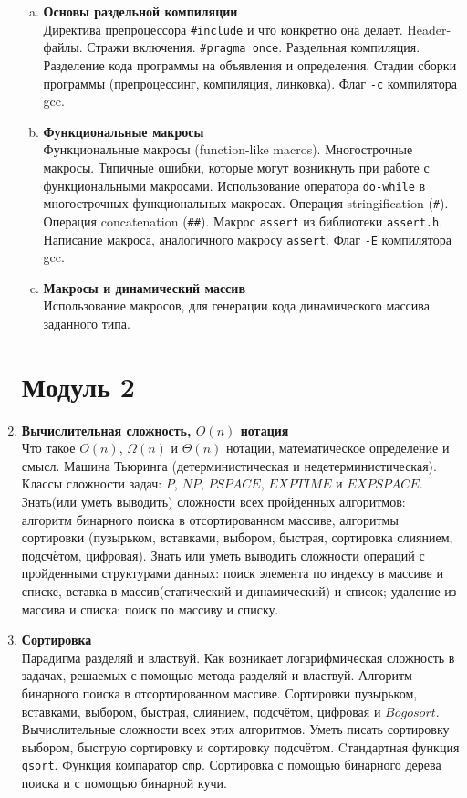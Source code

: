 \documentclass{article}
\begin{document}
\begin{enumerate}
\begin{enumerate}[a.]
\item \textbf{Основы раздельной компиляции}\\
Директива препроцессора \texttt{\#include} и что конкретно она делает. Header-файлы.
Стражи включения. \texttt{\#pragma once}. Раздельная компиляция. Разделение кода программы на объявления и определения.
Стадии сборки программы (препроцессинг, компиляция, линковка). Флаг \texttt{-c} компилятора gcc.


\item \textbf{Функциональные макросы}\\
Функциональные макросы (function-like macros). Многострочные макросы. Типичные ошибки, которые могут возникнуть при работе с функциональными макросами. Использование оператора \texttt{do-while} в многострочных функциональных макросах. Операция stringification (\texttt{\#}). Операция concatenation (\texttt{\#\#}). Макрос \texttt{assert} из библиотеки \texttt{assert.h}. Написание макроса, аналогичного макросу \texttt{assert}. Флаг \texttt{-E} компилятора gcc.

\item \textbf{Макросы и динамический массив}\\
Использование макросов, для генерации кода динамического массива заданного типа.
\end{enumerate}


\iffalse
\newpage
\section*{Модуль 2}
\item  \textbf{Вычислительная сложность, $O(n)$ нотация}\\
Что такое $O(n)$, $\Omega(n)$ и $\Theta(n)$ нотации, математическое определение и смысл. Машина Тьюринга (детерминистическая и недетерминистическая). Классы сложности задач: $P$, $NP$, $PSPACE$, $EXPTIME$ и $EXPSPACE$.
Знать(или уметь выводить) сложности всех пройденных алгоритмов: алгоритм бинарного поиска в отсортированном массиве, алгоритмы сортировки (пузырьком, вставками, выбором, быстрая, сортировка слиянием, подсчётом, цифровая). Знать или уметь выводить сложности операций с пройденными структурами данных: поиск элемента по индексу в массиве и списке, вставка в массив(статический и динамический) и список; удаление из массива и списка; поиск по массиву и списку.

\item \textbf{Сортировка}\\
Парадигма разделяй и властвуй. Как возникает логарифмическая сложность в задачах, решаемых с помощью метода разделяй и властвуй. Алгоритм бинарного поиска в отсортированном массиве.
Сортировки пузырьком, вставками, выбором, быстрая, слиянием, подсчётом, цифровая и $Bogosort$. Вычислительные сложности всех этих алгоритмов. Уметь писать сортировку выбором, быструю сортировку и сортировку подсчётом. Cтандартная функция \texttt{qsort}. Функция компаратор \texttt{cmp}. Сортировка с помощью бинарного дерева поиска и с помощью бинарной кучи.



\end{enumerate}
\end{document}
